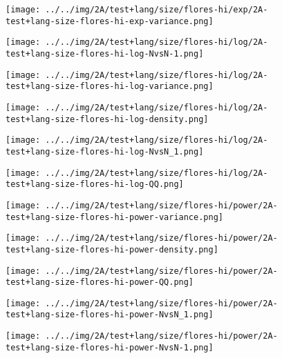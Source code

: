 \begin{figure}[H]
\centering	\texttt{[image: ../../img/2A/test+lang/size/flores-hi/exp/2A-test+lang-size-flores-hi-exp-variance.png]}
\end{figure}
\begin{figure}[H]
\centering	\texttt{[image: ../../img/2A/test+lang/size/flores-hi/log/2A-test+lang-size-flores-hi-log-NvsN-1.png]}
\end{figure}
\begin{figure}[H]
\centering	\texttt{[image: ../../img/2A/test+lang/size/flores-hi/log/2A-test+lang-size-flores-hi-log-variance.png]}
\end{figure}
\begin{figure}[H]
\centering	\texttt{[image: ../../img/2A/test+lang/size/flores-hi/log/2A-test+lang-size-flores-hi-log-density.png]}
\end{figure}
\begin{figure}[H]
\centering	\texttt{[image: ../../img/2A/test+lang/size/flores-hi/log/2A-test+lang-size-flores-hi-log-NvsN\_1.png]}
\end{figure}
\begin{figure}[H]
\centering	\texttt{[image: ../../img/2A/test+lang/size/flores-hi/log/2A-test+lang-size-flores-hi-log-QQ.png]}
\end{figure}
\begin{figure}[H]
\centering	\texttt{[image: ../../img/2A/test+lang/size/flores-hi/power/2A-test+lang-size-flores-hi-power-variance.png]}
\end{figure}
\begin{figure}[H]
\centering	\texttt{[image: ../../img/2A/test+lang/size/flores-hi/power/2A-test+lang-size-flores-hi-power-density.png]}
\end{figure}
\begin{figure}[H]
\centering	\texttt{[image: ../../img/2A/test+lang/size/flores-hi/power/2A-test+lang-size-flores-hi-power-QQ.png]}
\end{figure}
\begin{figure}[H]
\centering	\texttt{[image: ../../img/2A/test+lang/size/flores-hi/power/2A-test+lang-size-flores-hi-power-NvsN\_1.png]}
\end{figure}
\begin{figure}[H]
\centering	\texttt{[image: ../../img/2A/test+lang/size/flores-hi/power/2A-test+lang-size-flores-hi-power-NvsN-1.png]}
\end{figure}
